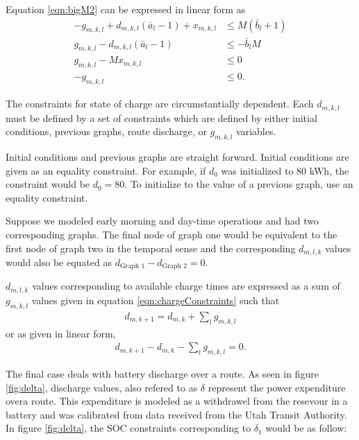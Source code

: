 \par Equation \ref{eqn:bigM2} can be expressed in linear form as 
\begin{equation}\label{eqn:chargeConstraints}
	\begin{aligned} 
		-g_{m,k,l} + d_{m,k,l}(\bar{a}_l - 1) + x_{m,k,l} &\le M(\bar{b}_l + 1) \\
		 g_{m,k,l} - d_{m,k,l}(\bar{a}_l - 1)  &\le  - \bar{b}_lM \\
		 g_{m,k,l} - Mx_{m,k,l} &\le 0 \\
		-g_{m,k,l} &\le 0.  
	\end{aligned}
\end{equation}
\par The constraints for state of charge are circumstantially dependent. Each $d_{m,k,l}$ must be defined by a set of constraints which are defined by either initial conditions, previous graphs, route discharge, or $g_{m,k,l}$ variables.
\par Initial conditions and previous graphs are straight forward.  Initial conditions are given as an equality constraint.  For example, if $d_0$ was initialized to 80 kWh, the constraint would be $d_0 = 80$.  To initialize to the value of a previous graph, use an equality constraint.  
\par Suppose we modeled early morning and day-time operations and had two corresponding graphs. The final node of graph one would be equivalent to the first node of graph two in the temporal sense and the corresponding $d_{m,l,k}$ values would also be equated as $d_{\text{Graph 1}} - d_{\text{Graph 2}} = 0$.
\par $d_{m,l,k}$ values corresponding to available charge times are expressed as a sum of $g_{m,k,l}$ values given in equation \ref{eqn:chargeConstraints} such that
\begin{align*}
	d_{m,k + 1} = d_{m,k} + \sum_l{g_{m,k,l}}
\end{align*}
or as given in linear form,
\begin{align}
	d_{m,k+1} - d_{m,k} - \sum_l{g_{m,k,l}} = 0.
\end{align}
\par The final case deals with battery discharge over a route.  As seen in figure \ref{fig:delta}, discharge values, also refered to as $\delta$ represent the power expenditure overa route.  This expenditure is modeled as a withdrawel from the resevour in a battery and was calibrated from data received from the Utah Transit Authority.  In figure \ref{fig:delta}, the SOC constraints corresponding to $\delta_1$ would be as follow:
